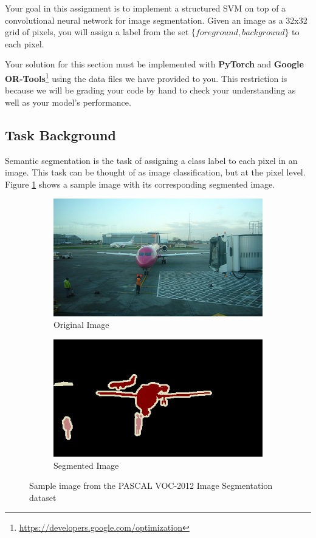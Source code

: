 \documentclass[11pt,addpoints,answers]{exam}
\numberwithin{equation}{section} %
\numberwithin{figure}{section} %
\numberwithin{table}{section} %
\begin{document}
Your goal in this assignment is to implement a structured SVM on top of a convolutional neural network for image segmentation. Given an image as a 32x32 grid of pixels, you will assign a label from the set $\{foreground, background\}$ to each pixel.


Your solution for this section must be implemented with \textbf{PyTorch} and \textbf{Google OR-Tools}\footnote{\url{https://developers.google.com/optimization}} using the data files we have provided to you. This restriction is because we will be grading your code by hand to check your understanding as well as your model's performance. 

\subsection{Task Background}
Semantic segmentation is the task of assigning a class label to each pixel in an image. This task can be thought of as image classification, but at the pixel level. Figure \ref{fig:seg_example} shows a sample image with its corresponding segmented image.
\begin{figure}[h]
\centering
\begin{subfigure}{.5\textwidth}
  \centering
  \includegraphics[width=.7\linewidth]{figures/orig_image.jpg}
  \caption{Original Image}
\end{subfigure}%
\begin{subfigure}{.5\textwidth}
  \centering
  \includegraphics[width=.7\linewidth]{figures/seg_image.png}
  \caption{Segmented Image}
\end{subfigure}
\caption{Sample image from the PASCAL VOC-2012 Image Segmentation dataset}
\label{fig:seg_example}
\end{figure}
\end{document}
